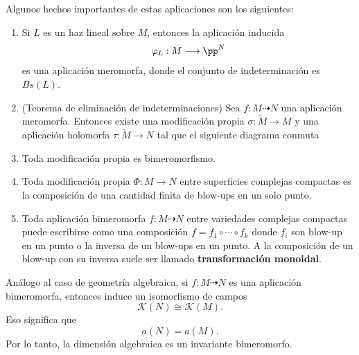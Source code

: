 \begin{remark}\parencite[Chap VII, Sec. 1]{grauertremment}
	Algunos hechos importantes de estas aplicaciones son los siguientes:
	\begin{enumerate}
		\item Si $L$ es un haz lineal sobre $M$, entonces la aplicación inducida
		\begin{equation*}
			\varphi_L:M\longrightarrow\pp^N
		\end{equation*}
		es una aplicación meromorfa, donde el conjunto de indeterminación es $Bs(L)$.
		\item (Teorema de eliminación de indeterminaciones) Sea $f:M\dashrightarrow N$ una aplicación meromorfa. Entonces existe una modificación propia $\sigma:\tilde{M}\to M$ y una aplicación holomorfa $\tau:\tilde{M}\to N$ tal que el siguiente diagrama conmuta
		\begin{center}
		\end{center}
		\item Toda modificación propia es bimeromorfismo.
		\item Toda modificación propia $\Phi:M\to N$ entre superficies complejas compactas es la composición de una cantidad finita de blow-ups en un solo punto.
		\item Toda aplicación bimeromorfa $f:M\dashrightarrow N$ entre variedades complejas compactas puede escribirse como una composición $f=f_1\circ\cdots\circ f_k$ donde $f_i$ son blow-up en un punto o la inversa de un blow-ups en un punto. A la composición de un blow-up con su inversa suele ser llamado \textbf{transformación monoidal}.
	\end{enumerate}
\end{remark}

Análogo al caso de geometría algebraica, si $f:M\dashrightarrow N$ es una aplicación bimeromorfa, entonces induce un isomorfismo de campos
\begin{equation*}
	\mathcal{K}(N)\cong \mathcal{K}(M).
\end{equation*}
Eso significa que
\begin{equation*}
	a(N)=a(M).
\end{equation*}
Por lo tanto, la dimensión algebraica es un invariante bimeromorfo. 


